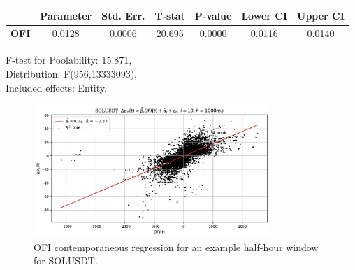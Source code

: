 \begin{table}
\begin{center}
\begin{tabular}{lclc}
\hline
\end{tabular}
\begin{tabular}{lcccccc}
             & \textbf{Parameter} & \textbf{Std. Err.} & \textbf{T-stat} & \textbf{P-value} & \textbf{Lower CI} & \textbf{Upper CI}  \\
\hline
\textbf{OFI} &       0.0128       &       0.0006       &      20.695     &      0.0000      &       0.0116      &       0.0140       \\
\hline
\end{tabular}
\end{center}
F-test for Poolability: 15.871, \\
Distribution: F(956,13333093), \\
Included effects: Entity.
\end{table}

\begin{figure}[htpb]
    \centering
    \includegraphics[width=0.8\textwidth]{./images/solusdt_h=1000ms_contemp_OFI.pdf}
    \caption{OFI contemporaneous regression for an example half-hour window for SOLUSDT.}
\end{figure}

\clearpage





